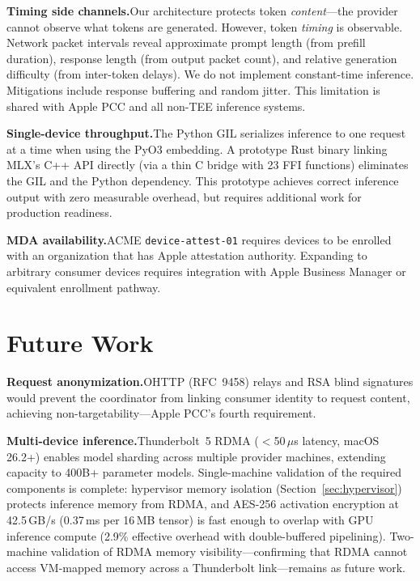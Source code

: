 \documentclass[10pt,twocolumn,letterpaper]{article}
\begin{document}
\textbf{Timing side channels.}\quad Our architecture protects token \emph{content}---the provider cannot observe what tokens are generated. However, token \emph{timing} is observable. Network packet intervals reveal approximate prompt length (from prefill duration), response length (from output packet count), and relative generation difficulty (from inter-token delays). We do not implement constant-time inference. Mitigations include response buffering and random jitter. This limitation is shared with Apple PCC and all non-TEE inference systems.

\textbf{Single-device throughput.}\quad The Python GIL serializes inference to one request at a time when using the PyO3 embedding. A prototype Rust binary linking MLX's C++ API directly (via a thin C bridge with 23 FFI functions) eliminates the GIL and the Python dependency. This prototype achieves correct inference output with zero measurable overhead, but requires additional work for production readiness.

\textbf{MDA availability.}\quad ACME \texttt{device-attest-01} requires devices to be enrolled with an organization that has Apple attestation authority. Expanding to arbitrary consumer devices requires integration with Apple Business Manager or equivalent enrollment pathway.

\section{Future Work}
\label{sec:future}

\textbf{Request anonymization.}\quad OHTTP (RFC~9458) relays and RSA blind signatures would prevent the coordinator from linking consumer identity to request content, achieving non-targetability---Apple PCC's fourth requirement.

\textbf{Multi-device inference.}\quad Thunderbolt~5 RDMA ($<$50\,$\mu$s latency, macOS 26.2+) enables model sharding across multiple provider machines, extending capacity to 400B+ parameter models. Single-machine validation of the required components is complete: hypervisor memory isolation (Section~\ref{sec:hypervisor}) protects inference memory from RDMA, and AES-256 activation encryption at 42.5\,GB/s (0.37\,ms per 16\,MB tensor) is fast enough to overlap with GPU inference compute (2.9\% effective overhead with double-buffered pipelining). Two-machine validation of RDMA memory visibility---confirming that RDMA cannot access VM-mapped memory across a Thunderbolt link---remains as future work.
\end{document}
